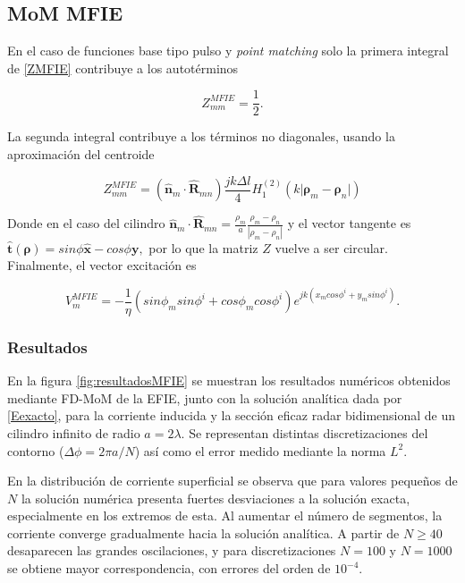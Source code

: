 \documentclass[11pt,a4paper,twoside,pdf]{article}
\numberwithin{equation}{section}
\begin{document}
\subsection{MoM MFIE}
\label{mfienum}

En el caso de funciones base tipo pulso y \textit{point matching} solo la primera integral de \ref{ZMFIE} contribuye a los autotérminos

$$
    Z^{MFIE}_{mm} = \frac{1}{2}.
$$

La segunda integral contribuye a los términos no diagonales, usando la aproximación del centroide

$$
    Z^{MFIE}_{mm} = (\boldsymbol{\hat{n}}_m \cdot \boldsymbol{\hat{R}}_{mn}) \frac{jk\Delta l}{4} H_1^{(2)}\!\left( k \lvert \boldsymbol{\rho}_m - \boldsymbol{\rho}_n \rvert \right)
$$

Donde en el caso del cilindro $\boldsymbol{\hat{n}}_m \cdot \boldsymbol{\hat{R}}_{mn} = \frac{\rho_m}{a} \frac{\rho_m - \rho_n}{|\rho_m - \rho_n|}$ y el vector tangente es $\boldsymbol{\hat{t}} (\boldsymbol{\rho}) = sin\phi \boldsymbol{\hat{x}} - cos\phi \boldsymbol{y},$ por lo que la matriz $Z$ vuelve a ser circular.\\

Finalmente, el vector excitación es

$$
    V^{MFIE}_m = -\frac{1}{\eta} (sin\phi_m sin\phi^i + cos\phi_m cos\phi^i) e^{jk (x_m cos\phi^i + y_m sin\phi^i)}.
$$


\subsubsection{Resultados}




En la figura \ref{fig:resultadosMFIE} se muestran los resultados numéricos obtenidos mediante FD-MoM de la EFIE, junto con la solución analítica dada por \ref{Eexacto}, para la corriente inducida y la sección eficaz radar bidimensional de un cilindro infinito de radio $a = 2\lambda$. Se representan distintas discretizaciones del contorno ($\Delta \phi = 2\pi a/ N$) así como el error medido mediante la norma $L^2$.

En la distribución de corriente superficial se observa que para valores pequeños de $N$ la solución numérica presenta fuertes desviaciones a la solución exacta, especialmente en los extremos de esta. Al aumentar el número de segmentos, la corriente converge gradualmente hacia la solución analítica. A partir de $N \geq 40$ desaparecen las grandes oscilaciones, y para discretizaciones $N = 100$ y $N = 1000$ se obtiene mayor correspondencia, con errores del orden de $10^{-4}$.
\end{document}
